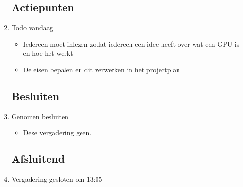 \documentclass{article}
\begin{document}
\begin{enumerate}
	\subsection*{Actiepunten}
	\item Todo vandaag
	\begin{itemize}
		\item Iedereen moet inlezen zodat iedereen een idee heeft over wat een GPU is en hoe het werkt
		\item De eisen bepalen en dit verwerken in het projectplan
	\end{itemize}

	\subsection*{Besluiten}
	\item Genomen besluiten
	\begin{itemize}
		\item Deze vergadering geen.
	\end{itemize}

	\noindent 
	\subsection*{Afsluitend}
	\item Vergadering gesloten om 13:05%

\end{enumerate}
\end{document}

